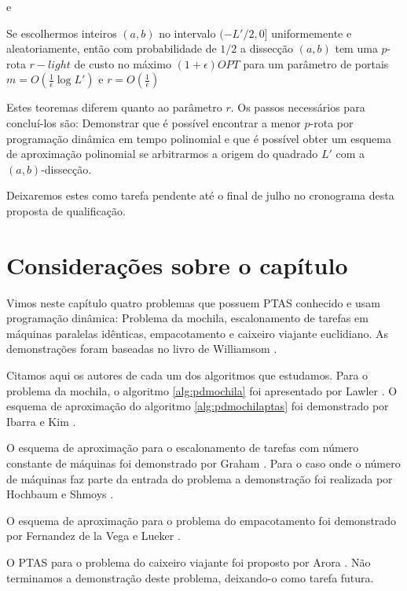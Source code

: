 e 

\begin{teorema}
Se escolhermos inteiros $(a,b)$ no intervalo $( -L' / 2,0]$ uniformemente e aleatoriamente, então com probabilidade de $1/2$ a dissecção $(a,b)$ tem uma $p$-rota $r-light$ de custo no máximo $(1 + \epsilon) OPT$ para um parâmetro de portais $ m = O\left( \frac{1}{\epsilon} \log L' \right) $ e $r = O\left( \frac{1}{\epsilon} \right)$
\end{teorema}

Estes teoremas diferem quanto ao parâmetro $r$. Os passos necessários para concluí-los são: Demonstrar que é possível encontrar a menor $p$-rota por programação dinâmica em tempo polinomial e que é possível obter um esquema de aproximação polinomial se arbitrarmos a origem do quadrado $L'$ com a $(a,b)$-dissecção.

Deixaremos estes como tarefa pendente até o final de julho no cronograma desta proposta de qualificação.

\section{Considerações sobre o capítulo}

Vimos neste capítulo quatro problemas que possuem PTAS conhecido e usam programação dinâmica: Problema da mochila, escalonamento de tarefas em máquinas paralelas idênticas, empacotamento e caixeiro viajante euclidiano. As demonstrações foram baseadas no livro de Williamsom \cite{Williamson}.

Citamos aqui os autores de cada um dos algoritmos que estudamos. Para o problema da mochila, o algoritmo \ref{alg:pdmochila} foi apresentado por Lawler \cite{lawler}. O esquema de aproximação do algoritmo \ref{alg:pdmochilaptas} foi demonstrado por Ibarra e Kim \cite{ibarra}.

O esquema de aproximação para o escalonamento de tarefas com número constante de máquinas foi demonstrado por Graham \cite{graham}. Para o caso onde o número de máquinas faz parte da entrada do problema a demonstração foi realizada por Hochbaum e Shmoys \cite{hochbaum}. 

O esquema de aproximação para o problema do empacotamento foi demonstrado por Fernandez de la Vega e Lueker \cite{vega}.

O PTAS para o problema do caixeiro viajante foi proposto por Arora \cite{arora1998polynomial}. Não terminamos a demonstração deste problema, deixando-o como tarefa futura.

